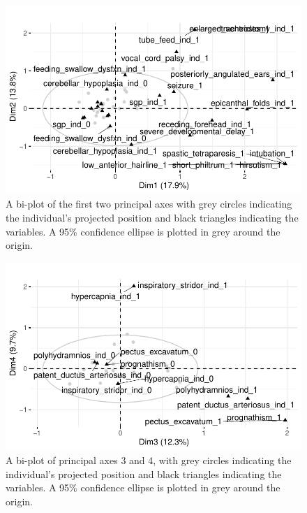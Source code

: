 \documentclass[
  letterpaper,
  DIV=11,
  numbers=noendperiod]{scrartcl}
\begin{document}
\begin{figure}

{\centering \includegraphics{paper_files/figure-pdf/fig-biplot-1.pdf}

}

\caption{\label{fig-biplot}A bi-plot of the first two principal axes
with grey circles indicating the individual's projected position and
black triangles indicating the variables. A 95\% confidence ellipse is
plotted in grey around the origin.}

\end{figure}

\begin{figure}

{\centering \includegraphics{paper_files/figure-pdf/fig-biplot2-1.pdf}

}

\caption{\label{fig-biplot2}A bi-plot of principal axes 3 and 4, with
grey circles indicating the individual's projected position and black
triangles indicating the variables. A 95\% confidence ellipse is plotted
in grey around the origin.}

\end{figure}
\end{document}
